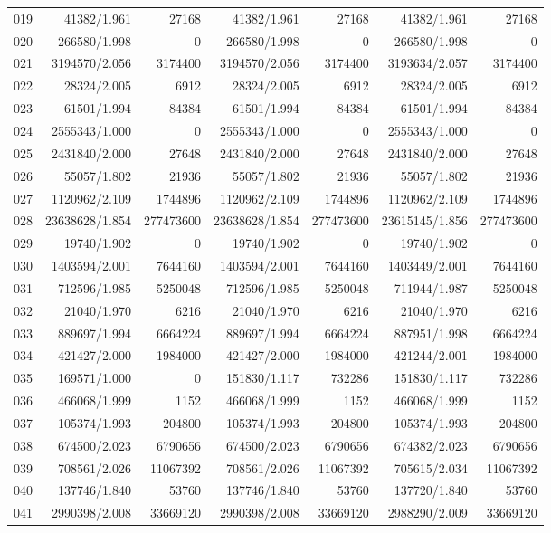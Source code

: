 \begin{longtable}{crrrrrr}
019 & 41382/1.961 & 27168 & 41382/1.961 & 27168 & 41382/1.961 & 27168 \\
020 & 266580/1.998 & 0 & 266580/1.998 & 0 & 266580/1.998 & 0 \\
021 & 3194570/2.056 & 3174400 & 3194570/2.056 & 3174400 & 3193634/2.057 & 3174400 \\
022 & 28324/2.005 & 6912 & 28324/2.005 & 6912 & 28324/2.005 & 6912 \\
023 & 61501/1.994 & 84384 & 61501/1.994 & 84384 & 61501/1.994 & 84384 \\
024 & 2555343/1.000 & 0 & 2555343/1.000 & 0 & 2555343/1.000 & 0 \\
025 & 2431840/2.000 & 27648 & 2431840/2.000 & 27648 & 2431840/2.000 & 27648 \\
026 & 55057/1.802 & 21936 & 55057/1.802 & 21936 & 55057/1.802 & 21936 \\
027 & 1120962/2.109 & 1744896 & 1120962/2.109 & 1744896 & 1120962/2.109 & 1744896 \\
028 & 23638628/1.854 & 277473600 & 23638628/1.854 & 277473600 & 23615145/1.856 & 277473600 \\
029 & 19740/1.902 & 0 & 19740/1.902 & 0 & 19740/1.902 & 0 \\
030 & 1403594/2.001 & 7644160 & 1403594/2.001 & 7644160 & 1403449/2.001 & 7644160 \\
031 & 712596/1.985 & 5250048 & 712596/1.985 & 5250048 & 711944/1.987 & 5250048 \\
032 & 21040/1.970 & 6216 & 21040/1.970 & 6216 & 21040/1.970 & 6216 \\
033 & 889697/1.994 & 6664224 & 889697/1.994 & 6664224 & 887951/1.998 & 6664224 \\
034 & 421427/2.000 & 1984000 & 421427/2.000 & 1984000 & 421244/2.001 & 1984000 \\
035 & 169571/1.000 & 0 & 151830/1.117 & 732286 & 151830/1.117 & 732286 \\
036 & 466068/1.999 & 1152 & 466068/1.999 & 1152 & 466068/1.999 & 1152 \\
037 & 105374/1.993 & 204800 & 105374/1.993 & 204800 & 105374/1.993 & 204800 \\
038 & 674500/2.023 & 6790656 & 674500/2.023 & 6790656 & 674382/2.023 & 6790656 \\
039 & 708561/2.026 & 11067392 & 708561/2.026 & 11067392 & 705615/2.034 & 11067392 \\
040 & 137746/1.840 & 53760 & 137746/1.840 & 53760 & 137720/1.840 & 53760 \\
041 & 2990398/2.008 & 33669120 & 2990398/2.008 & 33669120 & 2988290/2.009 & 33669120 \\

\end{longtable}
